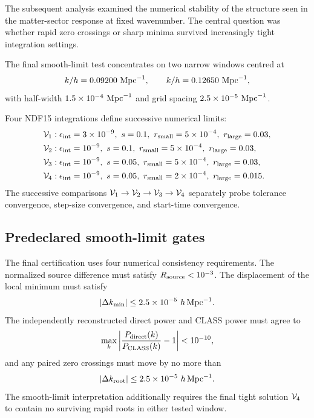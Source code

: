 The subsequent analysis examined the numerical stability of the structure seen in the matter-sector response at fixed wavenumber. The central question was whether rapid zero crossings or sharp minima survived increasingly tight integration settings.

The final smooth-limit test concentrates on two narrow windows centred at
\begin{equation}
k/h=0.09200\ {\rm Mpc}^{-1},\qquad k/h=0.12650\ {\rm Mpc}^{-1},
\end{equation}
with half-width $1.5\times10^{-4}\ {\rm Mpc}^{-1}$ and grid spacing $2.5\times10^{-5}\ {\rm Mpc}^{-1}$.

Four NDF15 integrations define successive numerical limits:
\begin{align}
{\cal V}_1 &: \epsilon_{\rm int}=3\times10^{-9},\ s=0.1,\ r_{\rm small}=5\times10^{-4},\ r_{\rm large}=0.03,\\
{\cal V}_2 &: \epsilon_{\rm int}=10^{-9},\ s=0.1,\ r_{\rm small}=5\times10^{-4},\ r_{\rm large}=0.03,\\
{\cal V}_3 &: \epsilon_{\rm int}=10^{-9},\ s=0.05,\ r_{\rm small}=5\times10^{-4},\ r_{\rm large}=0.03,\\
{\cal V}_4 &: \epsilon_{\rm int}=10^{-9},\ s=0.05,\ r_{\rm small}=2\times10^{-4},\ r_{\rm large}=0.015.
\end{align}
The successive comparisons ${\cal V}_1\rightarrow{\cal V}_2\rightarrow{\cal V}_3\rightarrow{\cal V}_4$ separately probe tolerance convergence, step-size convergence, and start-time convergence.

\subsection{Predeclared smooth-limit gates}

The final certification uses four numerical consistency requirements. The normalized source difference must satisfy $R_{\rm source}<10^{-3}$. The displacement of the local minimum must satisfy
\begin{equation}
|\Delta k_{\rm min}|\leq2.5\times10^{-5}\ h\,{\rm Mpc}^{-1}.
\end{equation}
The independently reconstructed direct power and CLASS power must agree to
\begin{equation}
\max_k\left|\frac{P_{\rm direct}(k)}{P_{\rm CLASS}(k)}-1\right|<10^{-10},
\end{equation}
and any paired zero crossings must move by no more than
\begin{equation}
|\Delta k_{\rm root}|\leq2.5\times10^{-5}\ h\,{\rm Mpc}^{-1}.
\end{equation}
The smooth-limit interpretation additionally requires the final tight solution ${\cal V}_4$ to contain no surviving rapid roots in either tested window.

